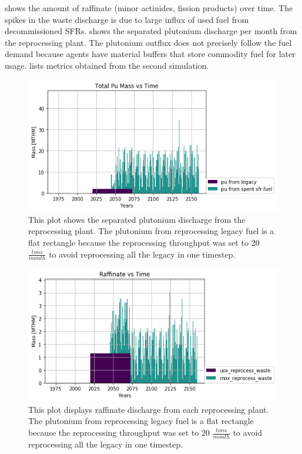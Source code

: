  shows the amount of raffinate
(minor actinides, fission products) over time. The spikes in the 
waste discharge is due to large influx of used fuel from
decommissioned \glspl{SFR}. shows the separated plutonium discharge
per month from the reprocessing plant. The plutonium outflux
does not precisely follow the fuel demand because \Cyclus agents have
material buffers that store commodity fuel for later usage. 
 lists metrics obtained from the second simulation.

\begin{figure}[htbp!]
	\begin{center}
		\includegraphics[scale=0.7]{./images/french-transition/pu.png}
	\end{center}
	\caption{This plot shows the separated plutonium discharge from the reprocessing plant.
			 The plutonium from reprocessing legacy fuel is a flat rectangle because the 
			 reprocessing throughput was set to 20 $\frac{tons}{month}$ to avoid reprocessing
			 all the legacy in one timestep.}
	\label{fig:pu_no_cum}
\end{figure}


\begin{figure}[htbp!]
	\begin{center}
		\includegraphics[scale=0.7]{./images/french-transition/reprocess_waste.png}
	\end{center}
	\caption{This plot displays raffinate discharge from each reprocessing plant.
			The plutonium from reprocessing legacy fuel is a flat rectangle because the 
			reprocessing throughput was set to 20 $\frac{tons}{month}$ to avoid reprocessing
			all the legacy in one timestep.}
	\label{fig:reprocess_waste}
\end{figure}


